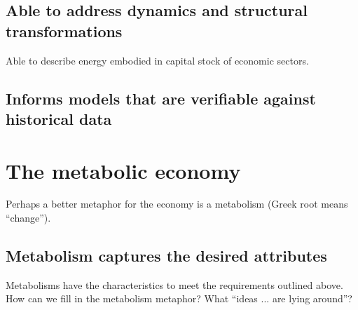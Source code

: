 \subsection{Able to address dynamics and structural transformations}
\label{sec:structure}

Able to describe energy embodied in capital stock of economic sectors.

\subsection{Informs models that are verifiable against historical data}
\label{sec:verifiable}

\section{The metabolic economy}
\label{sec:metabolic_economy}

Perhaps a better metaphor for the economy is a metabolism (Greek root means ``change''). 

\subsection{Metabolism captures the desired attributes}
\label{sec:metabolism_works}
     
Metabolisms have the characteristics to meet the requirements outlined above.
How can we fill in the metabolism metaphor? What ``ideas ... are lying around''?


